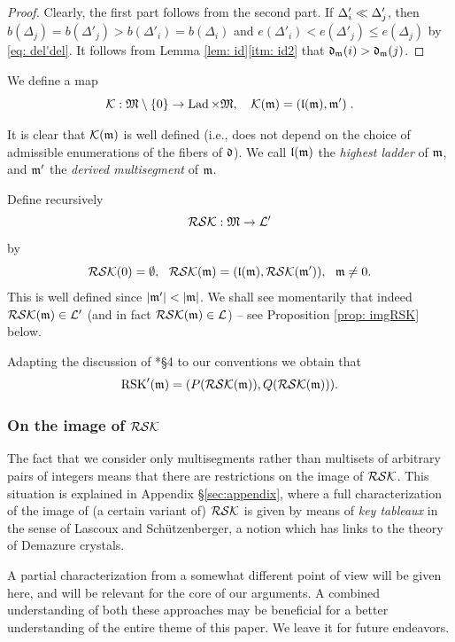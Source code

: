 \documentclass{ert-l} %
\begin{document}
\begin{proof}
Clearly, the first part follows from the second part.
If $\Delta'_i\ll\Delta'_j$, then
$b(\Delta_j)=b(\Delta'_j)>b(\Delta'_i)=b(\Delta_i)$
and $e(\Delta'_i)< e(\Delta'_j)\le e(\Delta_j)$ by \eqref{eq: del'del}.
It follows from Lemma \ref{lem: id}\eqref{itm: id2} that $\mathfrak{d}_{\mathfrak{m}}(i)>\mathfrak{d}_{\mathfrak{m}}(j)$.
\end{proof}


We define a map
\[
\mathcal{K}: \mathfrak{M}\setminus\{0\} \to \operatorname{Lad} \times \mathfrak{M},\quad \mathcal{K}(\mathfrak{m})=(\mathfrak{l}(\mathfrak{m}),\mathfrak{m}')\;.
\]

It is clear that $\mathcal{K}(\mathfrak{m})$ is well defined (i.e., does not depend on the choice
of admissible enumerations of the fibers of $\mathfrak{d}$).
We call $\mathfrak{l}(\mathfrak{m})$ the \emph{highest ladder} of $\mathfrak{m}$, and $\mathfrak{m}'$ the \emph{derived multisegment} of $\mathfrak{m}$.

Define recursively
\[
\mathcal{RSK}: \mathfrak{M} \to \mathcal{L}'
\]
by
\[
\RSK(0)=\emptyset,\ \ \RSK(\m)=(\ldrr{\m},\RSK(\drv\m)),\ \ \m\ne0.
\]
This is well defined since $|\drv\m|<|\m|$. We shall see momentarily that indeed $\mathcal{RSK}(\mathfrak{m})\in\mathcal{L}'$
(and in fact $\mathcal{RSK}(\mathfrak{m})\in\mathcal{L}$) -- see Proposition \ref{prop: imgRSK} below.


Adapting the discussion of \cite{MR0272654}*{\S4} to our conventions we obtain that
\[
\operatorname{RSK}'(\mathfrak{m}) = (P(\mathcal{RSK}(\mathfrak{m})),Q(\mathcal{RSK}(\mathfrak{m}))).
\]


\subsubsection{On the image of $\mathcal{RSK}$}
The fact that we consider only multisegments rather than multisets of arbitrary pairs of integers
means that there are restrictions on the image of $\mathcal{RSK}$. This situation is explained in Appendix \S\ref{sec:appendix},
where a full characterization of the image of (a certain variant of) $\mathcal{RSK}$ is given by means of \textit{key tableaux}
in the sense of Lascoux and Sch\"utzenberger, a notion which has links to the theory of Demazure crystals.

A partial characterization from a somewhat different point of view will be given here, and will be relevant for the core of our arguments.
A combined understanding of both these approaches may be beneficial for a better understanding of the entire theme of this paper. We leave it for future endeavors.
\end{document}
